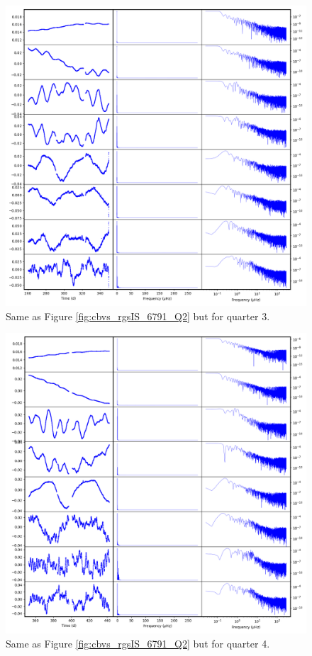 \begin{figure}
    \centering
    \includegraphics[width=\linewidth]{Chapter_Appended/AppB/cbv_6791_rgs_q03.png}
    \caption{Same as Figure \ref{fig:cbvs_rgsIS_6791_Q2} but for quarter 3.}
    \label{fig:cbvs_rgsIS_6791_Q03}
\end{figure}


\begin{figure}
    \centering
    \includegraphics[width=\linewidth]{Chapter_Appended/AppB/cbv_6791_rgs_q04.png}
    \caption{Same as Figure \ref{fig:cbvs_rgsIS_6791_Q2} but for quarter 4.}
    \label{fig:cbvs_rgsIS_6791_Q04}
\end{figure}


